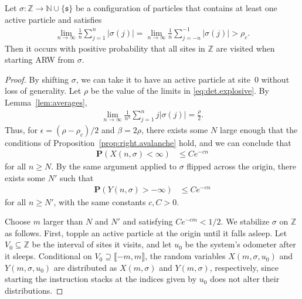 \documentclass[ECP]{ejpecp} %
\begin{document}
\begin{proposition}%
\label{prop:det.explosive}
Let $\sigma \colon \mathbb{Z}\to \mathbb{N}\cup \{\mathfrak{s}\}$ be a
configuration of particles that contains at least one active particle and
satisfies
%
\begin{align}
\label{eq:det.explosive}
\lim _{n\to \infty}\frac {1} {n} \sum _{j=1}^{n}\mathopen{\lvert }\sigma (j)\mathclose{\rvert }=
\lim _{n\to \infty}\frac {1} {n} \sum _{j=-n}^{-1}\mathopen{\lvert }\sigma (j)\mathclose{\rvert }>
\rho _{c}.
\end{align}
%
Then it occurs with positive probability that all sites in
$\mathbb{Z}$ are visited when starting ARW from $\sigma $.
\end{proposition}
%
\begin{proof}
By shifting $\sigma $, we can take it to have an active particle at site~$0$
without loss of generality. Let $\rho $ be the value of the limits in
\eqref{eq:det.explosive}. By Lemma~\ref{lem:averages},
%
\begin{align*}
\lim _{n\to \infty}\frac{1}{n^{2}}\sum _{j=1}^{n} j\mathopen{\lvert }\sigma (j)\mathclose{\rvert }=
\frac{\rho }{2}.
\end{align*}
%
Thus, for $\epsilon =(\rho -\rho _{c})/2$ and $\beta = 2\rho $, there exists
some $N$ large enough that the conditions of Proposition~\ref{prop:right.avalanche}
hold, and we can conclude that
%
\begin{align*}
\mathbf{P}(X(n, \sigma )<\infty ) &\leq Ce^{-cn}
\end{align*}
%
for all $n\geq N$. By the same argument applied to $\sigma $ flipped across
the origin, there exists some $N'$ such that
%
\begin{align*}
\mathbf{P}(Y(n, \sigma )>-\infty ) &\leq Ce^{-cn}
\end{align*}
%
for all $n\geq N'$, with the same constants $c,C>0$.

Choose $m$ larger than $N$ and $N'$ and satisfying $Ce^{-cm}<1/2$. We stabilize
$\sigma $ on $\mathbb{Z}$ as follows. First, topple an active particle
at the origin until it falls asleep. Let $V_{0}\subseteq \mathbb{Z}$ be
the interval of sites it visits, and let $u_{0}$ be the system's odometer
after it sleeps. Conditional on $V_{0} \supseteq \mathopen{\llbracket }-m,m \mathclose{\rrbracket }$, the random
variables $X(m, \sigma , u_{0})$ and $Y(m, \sigma , u_{0})$ are distributed
as $X(m,\sigma )$ and $Y(m,\sigma )$, respectively, since starting the
instruction stacks at the indices given by $u_{0}$ does not alter their
distributions.


\end{proof}
\end{document}

